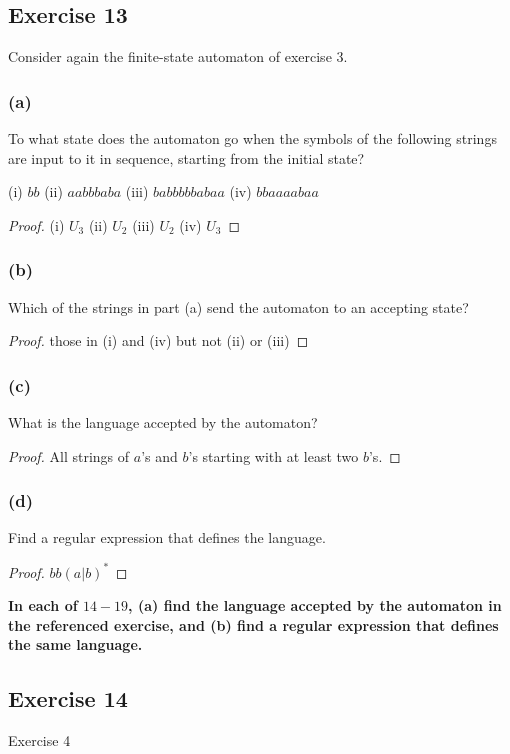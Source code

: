 \documentclass[14pt]{extarticle}
\newcommand{\cy}{\color{cyan}}
\begin{document}
\subsection{Exercise 13}
Consider again the finite-state automaton of exercise 3.

\subsubsection{(a)}
To what state does the automaton go when the symbols of the following strings are input to it in sequence, starting from 
the initial state? 

(i) \(bb\) (ii) \(aabbbaba\) (iii) \(babbbbbabaa\) (iv) \(bbaaaabaa\)

\begin{proof}
(i) \(U_3\) (ii) \(U_2\) (iii) \(U_2\) (iv) \(U_3\)
\end{proof}

\subsubsection{(b)}
Which of the strings in part (a) send the automaton to an accepting state?

\begin{proof}
those in (i) and (iv) but not (ii) or (iii)
\end{proof}

\subsubsection{(c)}
What is the language accepted by the automaton?

\begin{proof}
All strings of \(a\)'s and \(b\)'s starting with at least two \(b\)'s.
\end{proof}

\subsubsection{(d)}
Find a regular expression that defines the language.

\begin{proof}
\(bb(a|b)^*\)
\end{proof}

{\bf \cy In each of \(14-19\), (a) find the language accepted by the automaton in the referenced exercise, and (b) find a 
regular expression that defines the same language.}

\subsection{Exercise 14}
Exercise 4
\end{document}

